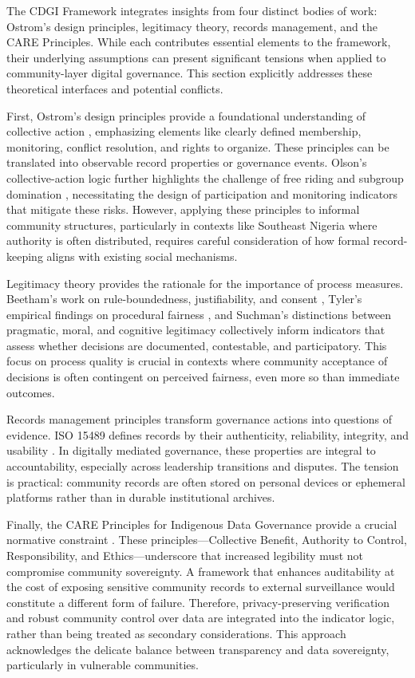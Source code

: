 \documentclass[review,onecolumn]{elsarticle}
\begin{document}
The CDGI Framework integrates insights from four distinct bodies of work: Ostrom’s design principles, legitimacy theory, records management, and the CARE Principles. While each contributes essential elements to the framework, their underlying assumptions can present significant tensions when applied to community-layer digital governance. This section explicitly addresses these theoretical interfaces and potential conflicts.

First, Ostrom’s design principles provide a foundational understanding of collective action \cite{ostrom1990}, emphasizing elements like clearly defined membership, monitoring, conflict resolution, and rights to organize. These principles can be translated into observable record properties or governance events. Olson’s collective-action logic further highlights the challenge of free riding and subgroup domination \cite{olson1965}, necessitating the design of participation and monitoring indicators that mitigate these risks. However, applying these principles to informal community structures, particularly in contexts like Southeast Nigeria where authority is often distributed, requires careful consideration of how formal record-keeping aligns with existing social mechanisms.

Legitimacy theory provides the rationale for the importance of process measures. Beetham’s work on rule-boundedness, justifiability, and consent \cite{beetham2013}, Tyler’s empirical findings on procedural fairness \cite{tyler2006}, and Suchman’s distinctions between pragmatic, moral, and cognitive legitimacy \cite{suchman1995} collectively inform indicators that assess whether decisions are documented, contestable, and participatory. This focus on process quality is crucial in contexts where community acceptance of decisions is often contingent on perceived fairness, even more so than immediate outcomes.

Records management principles transform governance actions into questions of evidence. ISO 15489 defines records by their authenticity, reliability, integrity, and usability \cite{iso2016}. In digitally mediated governance, these properties are integral to accountability, especially across leadership transitions and disputes. The tension is practical: community records are often stored on personal devices or ephemeral platforms rather than in durable institutional archives.

Finally, the CARE Principles for Indigenous Data Governance provide a crucial normative constraint \cite{carroll2020}. These principles—Collective Benefit, Authority to Control, Responsibility, and Ethics—underscore that increased legibility must not compromise community sovereignty. A framework that enhances auditability at the cost of exposing sensitive community records to external surveillance would constitute a different form of failure. Therefore, privacy-preserving verification and robust community control over data are integrated into the indicator logic, rather than being treated as secondary considerations. This approach acknowledges the delicate balance between transparency and data sovereignty, particularly in vulnerable communities.
\end{document}

